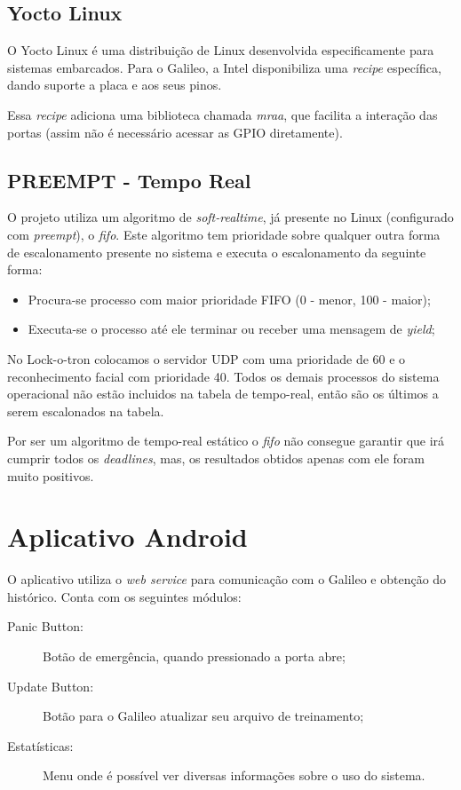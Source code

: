 \documentclass[12pt]{article}
\begin{document}
\subsection{Yocto Linux}
    O Yocto Linux é uma distribuição de Linux desenvolvida especificamente para
    sistemas embarcados. Para o Galileo, a Intel disponibiliza uma
     \textit{recipe} específica, dando suporte a placa e aos seus pinos.

    Essa \textit{recipe} adiciona uma biblioteca chamada \textit{mraa},
    que facilita a interação das portas (assim não é necessário acessar as GPIO
    diretamente).

\subsection{PREEMPT - Tempo Real}
    O projeto utiliza um algoritmo de \textit{soft-realtime}, já presente no Linux
    (configurado com \textit{preempt}), o \textit{fifo}. Este algoritmo tem
    prioridade sobre qualquer outra forma de escalonamento presente no sistema
    e executa o escalonamento da seguinte forma:
    \begin{itemize}
        \item Procura-se processo com maior prioridade FIFO (0 - menor, 100 -
        maior);
        \item Executa-se o processo até ele terminar ou receber uma mensagem de
        \textit{yield};
    \end{itemize}

    No Lock-o-tron colocamos o servidor UDP com uma prioridade de 60 e o
    reconhecimento facial com prioridade 40. Todos os demais processos do
    sistema operacional não estão incluidos na tabela de tempo-real, então são
    os últimos a serem escalonados na tabela.

    Por ser um algoritmo de tempo-real estático o \textit{fifo} não consegue
    garantir que irá cumprir todos os \textit{deadlines}, mas, os resultados obtidos
    apenas com ele foram muito positivos.

\section{Aplicativo Android}
    O aplicativo utiliza o \textit{web service} para comunicação com o Galileo e
    obtenção do histórico. Conta com os seguintes módulos:
    \begin{description}
        \item[Panic Button:] Botão de emergência, quando pressionado a porta
        abre;
        \item[Update Button:] Botão para o Galileo atualizar seu arquivo de
        treinamento;
        \item[Estatísticas:] Menu onde é possível ver diversas informações sobre
        o uso do sistema.
    \end{description}
\end{document}
